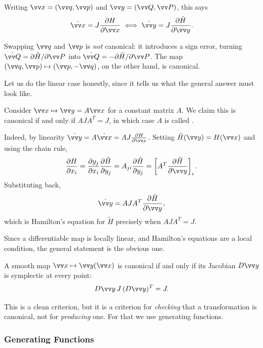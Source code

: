 Writing $\vv x = (\vv q, \vv p)$ and $\vv y = (\vv Q, \vv P)$, this says
$$
\dot{\vv x} = J\frac{\partial H}{\partial \vv x} \iff \dot{\vv y} = J \frac{\partial \tilde H}{\partial \vv y}.
$$

\begin{example}
	Swapping $\vv q$ and $\vv p$ is \emph{not} canonical: it introduces a sign error, turning $\dot{\vv Q} = \partial \tilde H/\partial \vv P$ into $\dot{\vv Q} = -\partial \tilde H/\partial \vv P$. The map $(\vv q, \vv p)\mapsto (\vv p, -\vv q)$, on the other hand, is canonical.
\end{example}

Let us do the linear case honestly, since it tells us what the general answer must look like.

\begin{example}
	Consider $\vv x \mapsto \vv y = A\vv x$ for a constant matrix $A$. We claim this is canonical if and only if $AJA^T = J$, in which case $A$ is called .

	Indeed, by linearity $\dot{\vv y} = A \dot{\vv x} = AJ\frac{\partial H}{\partial \vv x}$. Setting $\tilde H(\vv y) = H(\vv x)$ and using the chain rule,
	$$
	\frac{\partial H}{\partial x_i} = \frac{\partial y_j}{\partial x_i}\frac{\partial \tilde H}{\partial y_j} = A_{ji}\frac{\partial \tilde H}{\partial y_j} = \left[A^T\frac{\partial \tilde H}{\partial \vv y}\right]_i.
	$$
	Substituting back,
	$$
	\dot{\vv y} = AJA^T\frac{\partial \tilde H}{\partial \vv y},
	$$
	which is Hamilton's equation for $\tilde H$ precisely when $AJA^T = J$.
\end{example}

Since a differentiable map is locally linear, and Hamilton's equations are a local condition, the general statement is the obvious one.

\begin{proposition}
	A smooth map $\vv x \mapsto \vv y(\vv x)$ is canonical if and only if its Jacobian $D\vv y$ is symplectic at every point:
	$$
	D\vv y\, J\, (D\vv y)^T = J.
	$$
\end{proposition}

This is a clean criterion, but it is a criterion for \emph{checking} that a transformation is canonical, not for \emph{producing} one. For that we use generating functions.

\subsubsection{Generating Functions}

